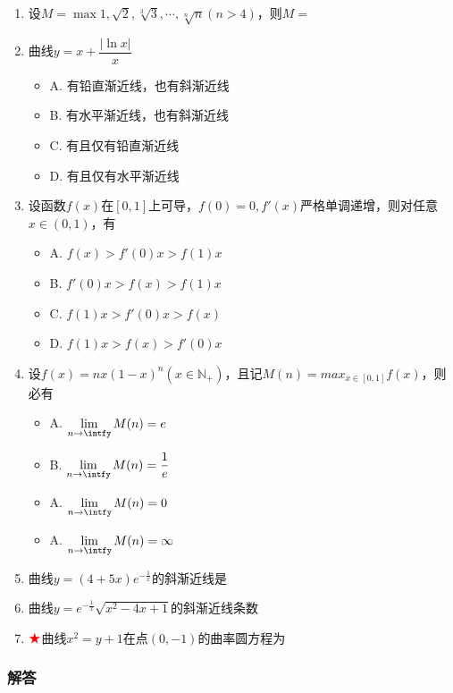 \documentclass[./book.tex]{subfiles}
\begin{document}
\begin{enumerate}
\begin{itemize}
        \end{itemize}
        \item 设$M = \max{1, \sqrt{2}, \sqrt[3]{3}, \cdots, \sqrt[n]{n}}(n > 4)$，则$M = $
        \item 曲线$y = x + \dfrac{|\ln x|}{x}$
        \begin{itemize}
            \item A. 有铅直渐近线，也有斜渐近线
            \item B. 有水平渐近线，也有斜渐近线
            \item C. 有且仅有铅直渐近线
            \item D. 有且仅有水平渐近线
        \end{itemize}
        \item 设函数$f(x)$在$[0, 1]$上可导，$f(0) = 0, f'(x)$严格单调递增，则对任意$x\in (0, 1)$，有
        \begin{itemize}
            \item A. $f(x) > f'(0)x > f(1)x$
            \item B. $f'(0)x > f(x) > f(1)x$
            \item C. $f(1)x > f'(0)x > f(x)$
            \item D. $f(1)x > f(x) > f'(0)x$
        \end{itemize}
        \item 设$f(x) = nx(1-x)^n(x\in \mathbb{N}_+)$，且记$M(n) = max_{x\in[0, 1]} f(x)$，则必有
        \begin{itemize}
            \item A. $\lim\limits_{n\to \intfy} M(n) = e$
            \item B. $\lim\limits_{n\to \intfy} M(n) = \dfrac{1}{e}$
            \item A. $\lim\limits_{n\to \intfy} M(n) = 0$
            \item A. $\lim\limits_{n\to \intfy} M(n) = \infty$
        \end{itemize}
        \item 曲线$y = (4+5x)e^{-\frac{1}{x}}$的斜渐近线是
        \item 曲线$y = e^{-\frac{1}{x}}\sqrt{x^2 - 4x + 1}$的斜渐近线条数
        \item $\color{red}{\bigstar}$曲线$x^2 = y + 1$在点$(0, -1)$的曲率圆方程为
    \end{enumerate}

    \subsubsection{解答}
\end{document}
